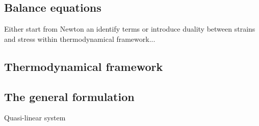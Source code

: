 \subsection{Balance equations}
Either start from Newton an identify terms or introduce duality between strains and stress within thermodynamical framework...
\subsection{Thermodynamical framework}
\subsection{The general formulation}
Quasi-linear system




